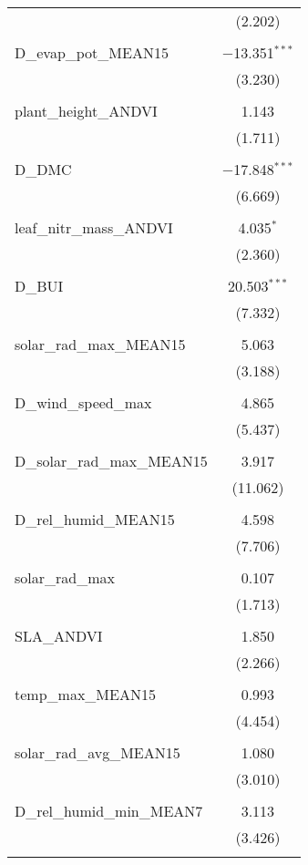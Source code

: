 \begin{table}[!htbp]
\begin{tabular}{@{\extracolsep{5pt}}lc}
  & (2.202) \\ 
  & \\ 
 D\_evap\_pot\_MEAN15 & $-$13.351$^{***}$ \\ 
  & (3.230) \\ 
  & \\ 
 plant\_height\_ANDVI & 1.143 \\ 
  & (1.711) \\ 
  & \\ 
 D\_DMC & $-$17.848$^{***}$ \\ 
  & (6.669) \\ 
  & \\ 
 leaf\_nitr\_mass\_ANDVI & 4.035$^{*}$ \\ 
  & (2.360) \\ 
  & \\ 
 D\_BUI & 20.503$^{***}$ \\ 
  & (7.332) \\ 
  & \\ 
 solar\_rad\_max\_MEAN15 & 5.063 \\ 
  & (3.188) \\ 
  & \\ 
 D\_wind\_speed\_max & 4.865 \\ 
  & (5.437) \\ 
  & \\ 
 D\_solar\_rad\_max\_MEAN15 & 3.917 \\ 
  & (11.062) \\ 
  & \\ 
 D\_rel\_humid\_MEAN15 & 4.598 \\ 
  & (7.706) \\ 
  & \\ 
 solar\_rad\_max & 0.107 \\ 
  & (1.713) \\ 
  & \\ 
 SLA\_ANDVI & 1.850 \\ 
  & (2.266) \\ 
  & \\ 
 temp\_max\_MEAN15 & 0.993 \\ 
  & (4.454) \\ 
  & \\ 
 solar\_rad\_avg\_MEAN15 & 1.080 \\ 
  & (3.010) \\ 
  & \\ 
 D\_rel\_humid\_min\_MEAN7 & 3.113 \\ 
  & (3.426) \\ 
  & \\ 

\end{tabular}
\end{table}

